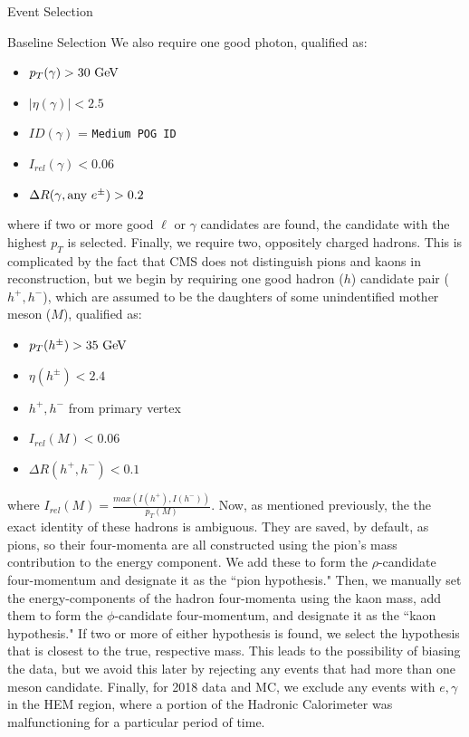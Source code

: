 \begin{section}{Event Selection}
\begin{subsection}{Baseline Selection}
\noindent We also require one good photon, qualified as:
\begin{itemize}
    \item $p_{T}(\gamma) > 30\textnormal{ GeV}$
    \item $|\eta(\gamma)| < 2.5$
    \item $ID(\gamma)$ = \verb|Medium POG ID|
    \item $I_{rel}(\gamma) < 0.06$
    \item $\Delta R(\gamma, \textnormal{any } e^{\pm}) > 0.2$
\end{itemize}
\noindent where if two or more good $\ell$ or $\gamma$ candidates are found, the candidate with the highest $p_{T}$ is selected. Finally, we require two, oppositely charged hadrons. This is complicated by the fact that CMS does not distinguish pions and kaons in reconstruction, but we begin by requiring one good hadron ($h$) candidate pair ($h^{+}, h^{-}$), which are assumed to be the daughters of some unindentified mother meson ($M$), qualified as:
\begin{itemize}
    \item $p_{T}(h^{\pm}) > 35\textnormal{ GeV}$
    \item $\eta(h^{\pm}) < 2.4$
    \item $h^{+}, h^{-}$ from primary vertex
    \item $I_{rel}(M) < 0.06$
    \item $\Delta R(h^{+}, h^{-}) < 0.1$
\end{itemize}
\noindent where $I_{rel}(M) = \frac{max(I(h^{+}), I(h^{-}))}{p_{T}(M)}$. Now, as mentioned previously, the the exact identity of these hadrons is ambiguous. They are saved, by default, as pions, so their four-momenta are all constructed using the pion's mass contribution to the energy component. We add these to form the $\rho$-candidate four-momentum and designate it as the ``pion hypothesis." Then, we manually set the energy-components of the hadron four-momenta using the kaon mass, add them to form the $\phi$-candidate four-momentum, and designate it as the ``kaon hypothesis." If two or more of either hypothesis is found, we select the hypothesis that is closest to the true, respective mass. This leads to the possibility of biasing the data, but we avoid this later by rejecting any events that had more than one meson candidate. Finally, for 2018 data and MC, we exclude any events with $e, \gamma$ in the HEM region, where a portion of the Hadronic Calorimeter was malfunctioning for a particular period of time.
\end{subsection}
\end{section}


